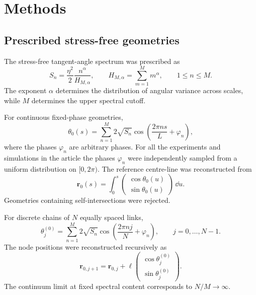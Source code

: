 \documentclass[pdflatex, twocolumn, sn-nature]{sn-jnl}
\begin{document}
\section*{Methods}
\label{sec:methods}

\subsection*{Prescribed stress-free geometries}
\label{sec:geometry_methods}
The stress-free tangent-angle spectrum was prescribed as
\begin{equation}
S_n
=
\frac{\eta^2}{2}
\frac{n^\alpha}{H_{M,\alpha}},
\qquad
H_{M,\alpha}
=
\sum_{m=1}^{M}m^\alpha,
\qquad
1\leq n\leq M.
\label{eq:spectrum_methods}
\end{equation}
The exponent $\alpha$ determines the distribution of angular variance across scales, while $M$ determines the upper spectral cutoff.

For continuous fixed-phase geometries,
\begin{equation}
\theta_0(s)
=
\sum_{n=1}^{M}
2\sqrt{S_n}
\cos\left(
\frac{2\pi ns}{L}+\varphi_n
\right),
\label{eq:fixed_geometry_methods}
\end{equation}
where the phases $\varphi_n$ are arbitrary phases.
For all the experiments and simulations in the article the phases $\varphi_n$ were independently sampled from a uniform distribution on $[0,2\pi)$. The reference centre-line was reconstructed from
\begin{equation}
\mathbf r_0(s)
=
\int_0^s
\begin{pmatrix}
\cos\theta_0(u)\\
\sin\theta_0(u)
\end{pmatrix}
\,\dd u .
\label{eq:centerline_methods}
\end{equation}
Geometries containing self-intersections were rejected. %

For discrete chains of $N$ equally spaced links,
\begin{equation}
\theta_j^{(0)}
=
\sum_{n=1}^{M}
2\sqrt{S_n}
\cos\left(
\frac{2\pi nj}{N}+\varphi_n
\right),
\qquad
j=0,\ldots,N-1.
\label{eq:sampled_geometry_methods}
\end{equation}
The node positions were reconstructed recursively as
\begin{equation}
\mathbf r_{0,j+1}
=
\mathbf r_{0,j}
+
\ell
\begin{pmatrix}
\cos\theta_j^{(0)}\\
\sin\theta_j^{(0)}
\end{pmatrix}.
\end{equation}
The continuum limit at fixed spectral content corresponds to $N/M\rightarrow\infty$.
\end{document}
